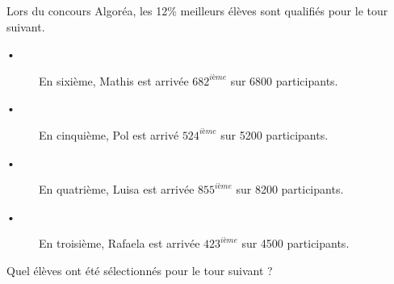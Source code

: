 
Lors du concours Algoréa, les 12\% meilleurs élèves sont qualifiés pour le tour suivant. 
\begin{description}
\item[•] En sixième, Mathis est arrivée $682^{ième}$ sur 6800 participants.
\item[•] En cinquième, Pol est arrivé $524^{ième}$ sur 5200 participants.
\item[•] En quatrième, Luisa est arrivée $855^{ième}$ sur 8200 participants.
\item[•] En troisième, Rafaela est arrivée $423^{ième}$ sur 4500 participants.
\end{description}
Quel élèves ont été sélectionnés pour le tour suivant ?
